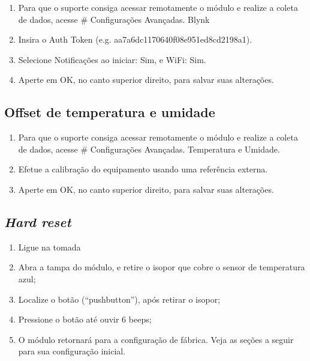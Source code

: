 \begin{enumerate}
    \item
    Para que o suporte consiga acessar remotamente o módulo e realize a coleta de dados, acesse \# \textrightarrow{} Configurações Avançadas.\textrightarrow{} Blynk

    \item
    Insira o Auth Token (e.g. aa7a6dc1170640f08e951ed8cd2198a1).

    \item
    Selecione Notificações ao iniciar: Sim, e WiFi: Sim.

    \item
    Aperte em OK, no canto superior direito, para salvar suas alterações.
\end{enumerate}

\subsection{Offset de temperatura e umidade}

\begin{enumerate}
    \item
    Para que o suporte consiga acessar remotamente o módulo e realize a coleta de dados, acesse \# \textrightarrow{} Configurações Avançadas.\textrightarrow{} Temperatura e Umidade.

    \item
    Efetue a calibração do equipamento usando uma referência externa.

    \item
    Aperte em OK, no canto superior direito, para salvar suas alterações.
\end{enumerate}

\subsection{\emph{Hard reset}}
\begin{enumerate}
	\item Ligue na tomada
	\item Abra a tampa do módulo, e retire o isopor que cobre o sensor de temperatura azul;
	\item Localize o botão (“pushbutton”), após retirar o isopor;
	\item Pressione o botão até ouvir 6 beeps;
	\item O módulo retornará para a configuração de fábrica. Veja as seções a seguir para sua configuração inicial.
\end{enumerate}

